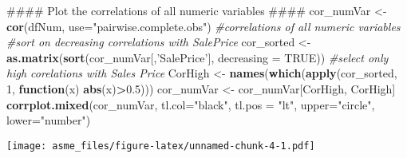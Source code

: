 \documentclass[]{article}
\newenvironment{Shaded}{\begin{snugshade}}{\end{snugshade}}
\newcommand{\KeywordTok}[1]{\textcolor[rgb]{0.13,0.29,0.53}{\textbf{#1}}}
\newcommand{\DataTypeTok}[1]{\textcolor[rgb]{0.13,0.29,0.53}{#1}}
\newcommand{\DecValTok}[1]{\textcolor[rgb]{0.00,0.00,0.81}{#1}}
\newcommand{\FloatTok}[1]{\textcolor[rgb]{0.00,0.00,0.81}{#1}}
\newcommand{\StringTok}[1]{\textcolor[rgb]{0.31,0.60,0.02}{#1}}
\newcommand{\CommentTok}[1]{\textcolor[rgb]{0.56,0.35,0.01}{\textit{#1}}}
\newcommand{\OtherTok}[1]{\textcolor[rgb]{0.56,0.35,0.01}{#1}}
\newcommand{\ControlFlowTok}[1]{\textcolor[rgb]{0.13,0.29,0.53}{\textbf{#1}}}
\newcommand{\OperatorTok}[1]{\textcolor[rgb]{0.81,0.36,0.00}{\textbf{#1}}}
\newcommand{\NormalTok}[1]{#1}
\begin{document}
\begin{Shaded}
\begin{Highlighting}[]
\NormalTok{#### Plot the correlations of all numeric variables ####}
\NormalTok{cor_numVar <-}\StringTok{ }\KeywordTok{cor}\NormalTok{(dfNum, }\DataTypeTok{use=}\StringTok{"pairwise.complete.obs"}\NormalTok{) }\CommentTok{#correlations of all numeric variables}
\CommentTok{#sort on decreasing correlations with SalePrice}
\NormalTok{cor_sorted <-}\StringTok{ }\KeywordTok{as.matrix}\NormalTok{(}\KeywordTok{sort}\NormalTok{(cor_numVar[,}\StringTok{'SalePrice'}\NormalTok{], }\DataTypeTok{decreasing =} \OtherTok{TRUE}\NormalTok{))}
\CommentTok{#select only high corelations with Sales Price}
\NormalTok{CorHigh <-}\StringTok{ }\KeywordTok{names}\NormalTok{(}\KeywordTok{which}\NormalTok{(}\KeywordTok{apply}\NormalTok{(cor_sorted, }\DecValTok{1}\NormalTok{, }\ControlFlowTok{function}\NormalTok{(x) }\KeywordTok{abs}\NormalTok{(x)}\OperatorTok{>}\FloatTok{0.5}\NormalTok{)))}
\NormalTok{cor_numVar <-}\StringTok{ }\NormalTok{cor_numVar[CorHigh, CorHigh]}
\KeywordTok{corrplot.mixed}\NormalTok{(cor_numVar, }\DataTypeTok{tl.col=}\StringTok{"black"}\NormalTok{, }\DataTypeTok{tl.pos =} \StringTok{"lt"}\NormalTok{, }\DataTypeTok{upper=}\StringTok{"circle"}\NormalTok{, }\DataTypeTok{lower=}\StringTok{"number"}\NormalTok{)}
\end{Highlighting}
\end{Shaded}

\texttt{[image: asme\_files/figure-latex/unnamed-chunk-4-1.pdf]}
\end{document}
